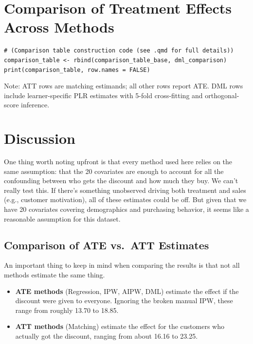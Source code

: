 \documentclass[12pt,a4paper]{article}
\begin{document}
\section{Comparison of Treatment Effects Across Methods}

\begin{lstlisting}
# (Comparison table construction code (see .qmd for full details))
comparison_table <- rbind(comparison_table_base, dml_comparison)
print(comparison_table, row.names = FALSE)
\end{lstlisting}

Note: ATT rows are matching estimands; all other rows report ATE. DML rows include learner-specific PLR estimates with 5-fold cross-fitting and orthogonal-score inference.

\section{Discussion}

One thing worth noting upfront is that every method used here relies on the same assumption: that the 20 covariates are enough to account for all the confounding between who gets the discount and how much they buy. We can't really test this. If there's something unobserved driving both treatment and sales (e.g., customer motivation), all of these estimates could be off. But given that we have 20 covariates covering demographics and purchasing behavior, it seems like a reasonable assumption for this dataset.

\subsection{Comparison of ATE vs.\ ATT Estimates}

An important thing to keep in mind when comparing the results is that not all methods estimate the same thing.

\begin{itemize}
\item \textbf{ATE methods} (Regression, IPW, AIPW, DML) estimate the effect if the discount were given to everyone. Ignoring the broken manual IPW, these range from roughly 13.70 to 18.85.
\item \textbf{ATT methods} (Matching) estimate the effect for the customers who actually got the discount, ranging from about 16.16 to 23.25.
\end{itemize}
\end{document}
